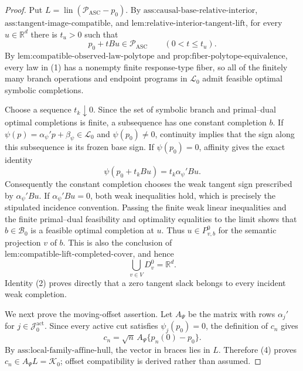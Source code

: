 \documentclass{article}
\begin{document}
\begin{proof}
Put \(L=\operatorname{lin}(\mathcal P_{\mathrm{ASC}}-p_0)\).  By
\(\text{ass:causal-base-relative-interior}\),
\(\text{ass:tangent-image-compatible}\), and
\(\text{lem:relative-interior-tangent-lift}\), for every
\(u\in\mathbb R^d\) there is \(t_u>0\) such that
\[
 p_0+tBu\in\mathcal P_{\mathrm{ASC}}
 \qquad(0<t\leq t_u).
\tag{1}
\]
By \(\text{lem:compatible-observed-law-polytope}\) and
\(\text{prop:fiber-polytope-equivalence}\), every law in (1) has a
nonempty finite response-type fiber, so all of the finitely many branch
operations and endpoint programs in \(\mathscr L_0\) admit feasible
optimal symbolic completions.

Choose a sequence \(t_k\downarrow0\).  Since the set of symbolic branch
and primal--dual optimal completions is finite, a subsequence has one
constant completion \(b\).  If
\(\psi(p)=\alpha_\psi'p+\beta_\psi\in\mathscr L_0\) and
\(\psi(p_0)\ne0\), continuity implies that the sign along this
subsequence is its frozen base sign.  If \(\psi(p_0)=0\), affinity gives
the exact identity
\[
 \psi(p_0+t_kBu)=t_k\alpha_\psi'Bu.
\tag{2}
\]
Consequently the constant completion chooses the weak tangent sign
prescribed by \(\alpha_\psi'Bu\).  If
\(\alpha_\psi'Bu=0\), both weak inequalities hold, which is precisely
the stipulated incidence convention.  Passing the finite weak linear
inequalities and the finite primal--dual feasibility and optimality
equalities to the limit shows that \(b\in\mathcal B_0\) is a feasible
optimal completion at \(u\).  Thus \(u\in P_{v,b}^0\) for the semantic
projection \(v\) of \(b\).  This is also the conclusion of
\(\text{lem:compatible-lift-completed-cover}\), and hence
\[
 \bigcup_{v\in V}D_v^0=\mathbb R^d.
\tag{3}
\]
Identity (2) proves directly that a zero tangent slack belongs to every
incident weak completion.

We next prove the moving-offset assertion.  Let \(A_\Psi\) be the
matrix with rows \(\alpha_j'\) for
\(j\in\mathcal J_0^{\mathrm{act}}\).  Since every active cut satisfies
\(\psi_j(p_0)=0\), the definition of \(c_n\) gives
\[
 c_n=\sqrt n\,A_\Psi\{p_n(0)-p_0\}.
\tag{4}
\]
By \(\text{ass:local-family-affine-hull}\), the vector in braces lies
in \(L\).  Therefore (4) proves
\(c_n\in A_\Psi L=\mathcal K_0\); offset compatibility is derived rather
than assumed.


\end{proof}
\end{document}
